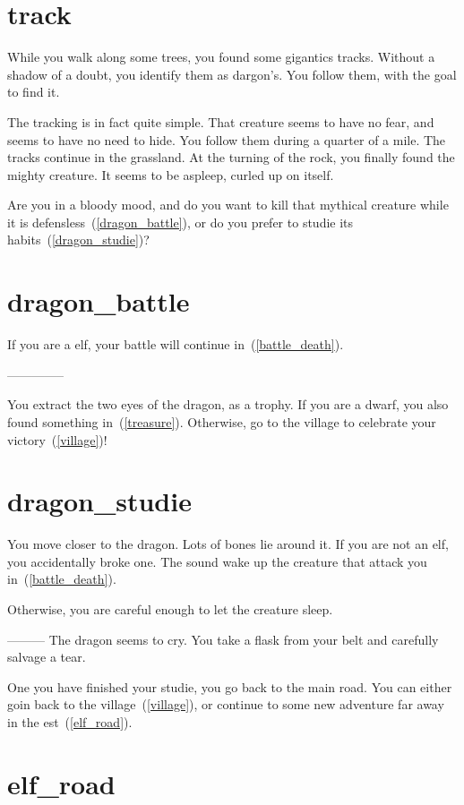 \section{track}

While you walk along some trees, you found some gigantics tracks. Without a
shadow of a doubt, you identify them as dargon's. You follow them, with
the goal to find it.

The tracking is in fact quite simple. That creature seems to have no fear, and
seems to have no need to hide. You follow them during a quarter of a mile. The
tracks continue in the grassland. At the turning of the rock, you finally found
the mighty creature. It seems to be aspleep, curled up on itself.

Are you in a bloody mood, and do you want to kill that mythical creature while it
is defensless~(\ref{dragon_battle}), or do you prefer to studie its
habits~(\ref{dragon_studie})?

\section{dragon_battle}

If you are a elf, your battle will continue in~(\ref{battle_death}).

--------------


You extract the two eyes of the dragon, as a trophy. If you are a dwarf, you
also found something in~(\ref{treasure}). Otherwise, go to the village to
celebrate your victory~(\ref{village})!

\section{dragon_studie}

You move closer to the dragon. Lots of bones lie around it. If you are not an
elf, you accidentally broke one. The sound wake up the creature that attack you
in~(\ref{battle_death}).

Otherwise, you are careful enough to let the creature sleep.

---------
The dragon seems to cry. You take a flask from your belt and carefully salvage a
tear.

One you have finished your studie, you go back to the main road. You can either
goin back to the village~(\ref{village}), or continue to some new adventure far
away in the est~(\ref{elf_road}).

\section{elf_road}

